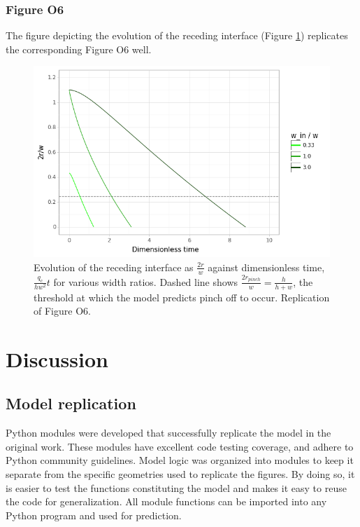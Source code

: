 \subsubsection{Figure O6}

The figure depicting the evolution of the receding interface (Figure \ref{fig6}) replicates
the corresponding Figure O6 well.

\begin{figure}[!htb]
  \centering
  \includegraphics[width=0.8\linewidth]{../figures/fig_6.png}
  \caption{Evolution of the receding interface as $\frac{2r}{w}$ against dimensionless time,
  $\frac{q_c}{hw^2}t$ for various width ratios. Dashed line shows $\frac{2r_{pinch}}{w}=\frac{h}{h+w}$,
  the threshold at which the model predicts pinch off to occur.
  Replication of Figure O6.}
  \label{fig6}
\end{figure}

\section{Discussion}

\subsection{Model replication}

Python modules were developed that successfully replicate the model in the original work.
These modules have excellent code testing coverage, and adhere to Python community guidelines.
Model logic was organized into modules to keep it separate from the specific geometries
used to replicate the figures. By doing so, it is easier to test the functions constituting
the model and makes it easy to reuse the code for generalization. All module functions can be
imported into any Python program and used for prediction.

